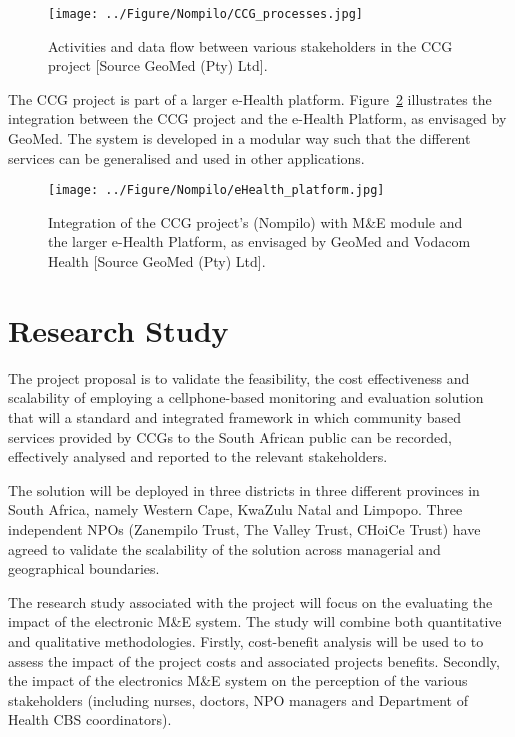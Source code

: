 \begin{figure} \centering 
\texttt{[image: ../Figure/Nompilo/CCG\_processes.jpg]}
\caption{Activities and data flow between various stakeholders in the  
CCG project [Source GeoMed (Pty) Ltd].}
\label{fig:nompilo_flow}
\end{figure}

The CCG project is part of a larger e-Health platform. Figure~\ref{fig:ehp} 
illustrates the integration between the CCG project and the e-Health 
Platform, as envisaged by GeoMed. The system is developed in a modular 
way such that the different services can be generalised and used in 
other applications. 

\begin{figure} \centering 
\texttt{[image: ../Figure/Nompilo/eHealth\_platform.jpg]}
\caption{Integration of the CCG project's (Nompilo) with M\&E module and 
the larger e-Health Platform, as envisaged by GeoMed and Vodacom Health 
[Source GeoMed (Pty) Ltd].}
\label{fig:ehp}
\end{figure}

\section*{Research Study}

The project proposal is to validate the feasibility, the cost effectiveness 
and scalability of employing a cellphone-based monitoring and evaluation 
solution that will a standard and integrated framework in which community 
based services provided by CCGs to the South African public can be recorded, 
effectively analysed and reported to the relevant stakeholders.

The solution will be deployed in three districts in three different provinces 
in South Africa, namely Western Cape, KwaZulu Natal and Limpopo. Three 
independent NPOs (Zanempilo Trust, The Valley Trust, CHoiCe Trust) 
have agreed to validate the scalability of the solution 
across managerial and geographical boundaries. 

The research study associated with the project will focus on the evaluating 
the impact of the electronic M\&E system. The study will combine both 
quantitative and qualitative methodologies. Firstly, cost-benefit 
analysis will be used to to assess the impact of the project costs and 
associated projects benefits. Secondly, the impact of the electronics M\&E 
system on the perception of the various stakeholders (including nurses, 
doctors, NPO managers and Department of Health CBS coordinators).  


